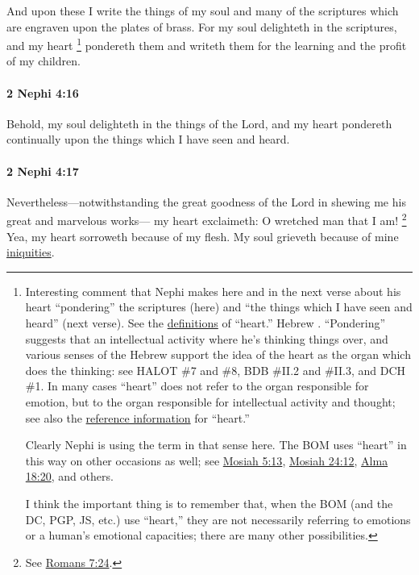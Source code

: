 			And upon these I write the things of my soul
			and many of the scriptures which are engraven upon the plates of brass.
			For my soul delighteth in the scriptures,
			and my heart%
			\footnote{%
				\label{2NEPHI-4-15-heart}%
				Interesting comment that Nephi makes here and in the next verse about his heart ``pondering'' the scriptures (here) and ``the things which I have seen and heard'' (next verse). See the \hyperref[HEART-1828]{definitions} of ``heart.'' Hebrew \hyperref[LEB]{}. ``Pondering'' suggests that an intellectual activity where he's thinking things over, and various senses of the Hebrew  support the idea of the heart as the organ which does the thinking: see HALOT \#7 and \#8, BDB \#II.2 and \#II.3, and DCH \#1. In many cases ``heart'' does not refer to the organ responsible for emotion, but to the organ responsible for intellectual activity and thought; see also the \hyperref[HEART-reference]{reference information} for ``heart.''
				
				Clearly Nephi is using the term in that sense here. The BOM uses ``heart'' in this way on other occasions as well; see \hyperref[MOSIAH-5-13]{Mosiah 5:13}, \hyperref[MOSIAH-24-12]{Mosiah 24:12}, \hyperref[ALMA-18-20]{Alma 18:20}, and others.
				
				I think the important thing is to remember that, when the BOM (and the DC, PGP, JS, etc.) use ``heart,'' they are not necessarily referring to emotions or a human's emotional capacities; there are many other possibilities.
				} 
			pondereth them
			and writeth them for the learning and the profit of my children.

		\paragraph{2 Nephi 4:16} %
			\label{2NEPHI-4-16}

			Behold, my soul delighteth in the things of the Lord,
			and my heart pondereth continually upon the things which I have seen and heard.

		\paragraph{2 Nephi 4:17} %
			\label{2NEPHI-4-17}

			Nevertheless---notwithstanding the great goodness of the Lord
			in shewing me his great and marvelous works---
			my heart exclaimeth:
			O wretched man that I am!%
				\footnote{%
					See \hyperref[ROMANS-7-24]{Romans 7:24}.
					}
			Yea, my heart sorroweth because of my flesh.
			My soul grieveth because of mine \hyperref[INIQUITY-1828]{iniquities}.

